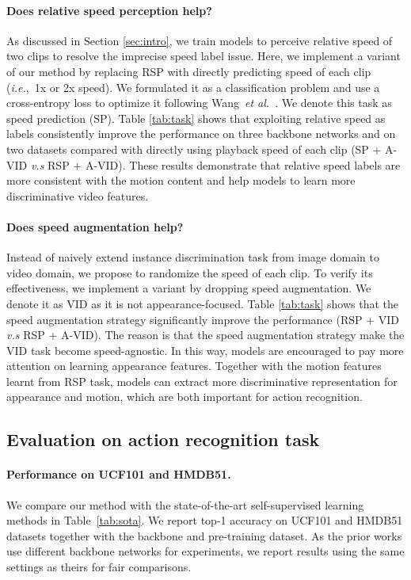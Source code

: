 \documentclass[final]{cvpr}
\def\etal{{\em et al.\/}\, }
\def\ie{\mbox{\textit{i.e.}, }}
\begin{document}
\paragraph{Does relative speed perception help?}
As discussed in Section \ref{sec:intro}, we train models to perceive relative speed of two clips to resolve the imprecise speed label issue. Here, we implement a variant of our method by replacing RSP with directly predicting speed of each clip (\ie 1x or 2x speed). We formulated it as a classification problem and use a cross-entropy loss to optimize it following Wang~\etal\cite{pace}. We denote this task as speed prediction (SP). Table \ref{tab:task} shows that exploiting relative speed as labels consistently improve the performance on three backbone networks and on two datasets compared with directly using playback speed of each clip (SP + A-VID \textit{v.s} RSP + A-VID). These results demonstrate that relative speed labels are more consistent with the motion content and help models to learn more discriminative video features. 

\paragraph{Does speed augmentation help?}
Instead of naively extend instance discrimination task from image domain to video domain, we propose to randomize the speed of each clip. To verify its effectiveness, we implement a variant by dropping speed augmentation. We denote it as VID as it is not appearance-focused. Table \ref{tab:task} shows that the speed augmentation strategy significantly improve the performance (RSP + VID \textit{v.s} RSP + A-VID). The reason is that the speed augmentation strategy make the VID task become speed-agnostic. In this way, models are encouraged to pay more attention on learning appearance features. Together with the motion features learnt from RSP task, models can extract more discriminative representation for appearance and motion, which are both important for action recognition.








\subsection{Evaluation on action recognition task}

\paragraph{Performance on UCF101 and HMDB51.}
We compare our method with the state-of-the-art self-supervised learning methods in Table~\ref{tab:sota}. We report top-1 accuracy on UCF101 and HMDB51 datasets together with the backbone and pre-training dataset.
As the prior works use different backbone networks for experiments, we report results using the same settings as theirs for fair comparisons. 
\end{document}
